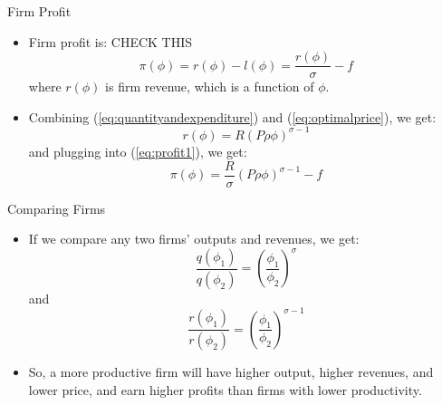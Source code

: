 \documentclass[aspectratio=169]{beamer}
\begin{document}

\begin{frame}{Firm Profit}

\begin{itemize}
    \item<1-> Firm profit is: CHECK THIS
    \begin{equation}
        \pi\left( \phi \right) = r\left( \phi \right) - l\left( \phi \right) = \frac{r\left( \phi \right)}{\sigma} - f
        \label{eq:profit1}
    \end{equation}
    where $ r\left( \phi \right) $ is firm revenue, which is a function of $ \phi $.
    \item<2-> Combining (\ref{eq:quantityandexpenditure}) and (\ref{eq:optimalprice}), we get:
    \begin{equation*}
        r\left( \phi \right) = R\left( P \rho \phi \right)^{\sigma - 1}
    \end{equation*}
    and plugging into (\ref{eq:profit1}), we get:
    \begin{equation*}
        \pi\left( \phi \right) = \frac{R}{\sigma}\left( P \rho \phi \right)^{\sigma - 1} - f
    \end{equation*}
\end{itemize}
    
\end{frame}


\begin{frame}{Comparing Firms}

\begin{itemize}
    \item<1-> If we compare any two firms’ outputs and revenues, we get:
    \begin{equation*}
        \frac{q\left( \phi_{1} \right)}{q\left( \phi_{2} \right)} = \left( \frac{\phi_{1}}{\phi_{2}} \right)^{\sigma}
    \end{equation*}
    and
    \begin{equation}
        \frac{r\left( \phi_{1} \right)}{r\left( \phi_{2} \right)} = \left( \frac{\phi_{1}}{\phi_{2}} \right)^{\sigma - 1}
        \label{eq:relativerevenue}
    \end{equation}
    \item<2-> So, a more productive firm will have higher output, higher revenues, and lower price, and earn higher profits than firms with lower productivity.
\end{itemize}
    
\end{frame}
\end{document}
